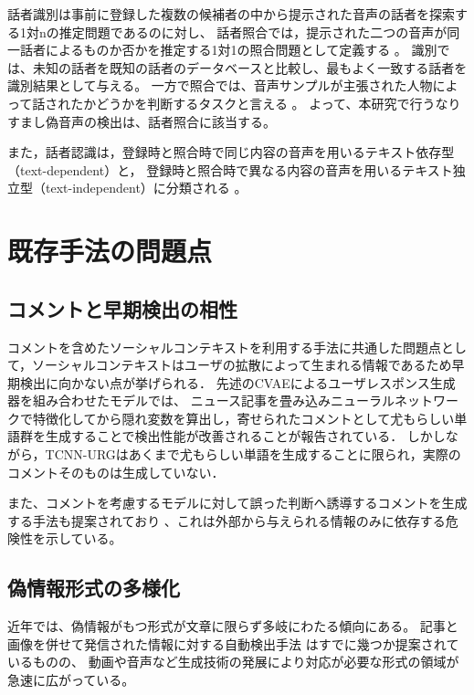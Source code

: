 話者識別は事前に登録した複数の候補者の中から提示された音声の話者を探索する1対nの推定問題であるのに対し、
話者照合では，提示された二つの音声が同一話者によるものか否かを推定する1対1の照合問題として定義する \cite{俵直弘2022}。
識別では、未知の話者を既知の話者のデータベースと比較し、最もよく一致する話者を識別結果として与える。
一方で照合では、音声サンプルが主張された人物によって話されたかどうかを判断するタスクと言える \cite{1561284}。
よって、本研究で行うなりすまし偽音声の検出は、話者照合に該当する。

また，話者認識は，登録時と照合時で同じ内容の音声を用いるテキスト依存型（text-dependent）と，
登録時と照合時で異なる内容の音声を用いるテキスト独立型（text-independent）に分類される \cite{俵直弘2022}。

\section{既存手法の問題点}
\subsection{コメントと早期検出の相性}
コメントを含めたソーシャルコンテキストを利用する手法に共通した問題点として，ソーシャルコンテキストはユーザの拡散によって生まれる情報であるため早期検出に向かない点が挙げられる．
先述のCVAEによるユーザレスポンス生成器を組み合わせたモデル\cite{ijcai2018-533}では、
ニュース記事を畳み込みニューラルネットワークで特徴化してから隠れ変数を算出し，寄せられたコメントとして尤もらしい単語群を生成することで検出性能が改善されることが報告されている．
しかしながら，TCNN-URGはあくまで尤もらしい単語を生成することに限られ，実際のコメントそのものは生成していない．

また、コメントを考慮するモデルに対して誤った判断へ誘導するコメントを生成する手法も提案されており \cite{9338282}、これは外部から与えられる情報のみに依存する危険性を示している。

\subsection{偽情報形式の多様化}
近年では、偽情報がもつ形式が文章に限らず多岐にわたる傾向にある。
記事と画像を併せて発信された情報に対する自動検出手法 \cite{10.1145/3219819.3219903,8919302}はすでに幾つか提案されているものの、
動画や音声など生成技術の発展により対応が必要な形式の領域が急速に広がっている。

